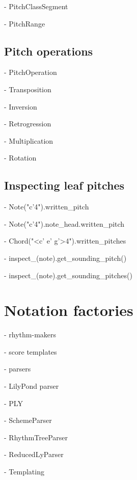 -   PitchClassSegment

-   PitchRange

\subsection{Pitch operations}

-   PitchOperation

-   Transposition

-   Inversion

-   Retrogression

-   Multiplication

-   Rotation

\subsection{Inspecting leaf pitches}

-   Note("c'4").written\_pitch

-   Note("c'4").note\_head.written\_pitch

-   Chord("<c' e' g'>4").written\_pitches

-   inspect\_(note).get\_sounding\_pitch()

-   inspect\_(note).get\_sounding\_pitches()

\section{Notation factories}

-   rhythm-makers

-   score templates

-   parsers

    -   LilyPond parser

    -   PLY

    -   SchemeParser

    -   RhythmTreeParser

    -   ReducedLyParser

- Templating